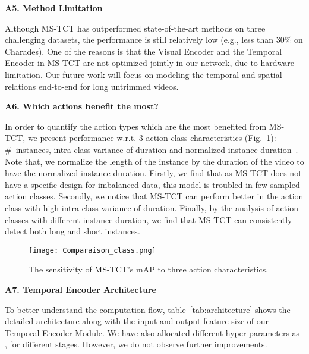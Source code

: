 \documentclass[10pt,twocolumn,letterpaper]{article}
\begin{document}
\vspace{0.1in}
\noindent \textbf{\large{A5. Method Limitation}}
\vspace{0.1in}

Although MS-TCT has outperformed state-of-the-art methods on three challenging datasets, the performance is still relatively low (e.g., less than 30\% on Charades). One of the reasons is that the Visual Encoder and the Temporal Encoder in MS-TCT are not optimized jointly in our network, due to hardware limitation. Our future work will focus on modeling the temporal and spatial relations end-to-end for long untrimmed videos. 

\vspace{0.1in}
\noindent \textbf{\large{A6. Which actions benefit the most?}}
\vspace{0.1in}

In order to quantify the action types which are the most benefited from MS-TCT, we present performance w.r.t. 3 action-class characteristics (Fig.~\ref{fig:comparaison_class}): \#~instances, intra-class variance of duration and normalized instance duration~\cite{alwassel2018diagnosing}. Note that, we normalize the length of the instance by the duration of the video to have the normalized instance duration. 
Firstly, we find that as MS-TCT does not have a specific design for imbalanced data, this model is troubled in few-sampled action classes. 
Secondly, we notice that MS-TCT can perform better in the action class with high intra-class variance of duration. 
Finally, by the analysis of action classes with different instance duration, we find that MS-TCT can consistently detect both long and short instances. 
\begin{figure}[h!]
\centering
\texttt{[image: Comparaison\_class.png]}
\caption{The sensitivity of MS-TCT's mAP to three action characteristics. 
}
\label{fig:comparaison_class}
\end{figure}

\noindent \textbf{\large{A7. Temporal Encoder Architecture}}
\label{sec:srchitecture}
\vspace{0.1in}

To better understand the computation flow, table~\ref{tab:architecture} shows the detailed architecture along with the input and output feature size of our Temporal Encoder Module. 
We have also allocated different hyper-parameters as ,  for different stages. However, we do not observe further improvements. 
\end{document}
